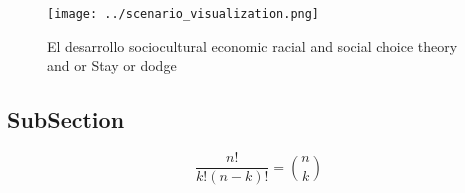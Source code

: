 \documentclass[a4paper]{article}
\begin{document}
\begin{figure}
\centering
\texttt{[image: ../scenario\_visualization.png]}
\caption{El desarrollo sociocultural economic racial and social choice theory and or Stay or dodge
}
\end{figure}
 
\subsection{SubSection}

\[ \frac{n!}{k!(n-k)!} = \binom{n}{k} \]
\end{document}
